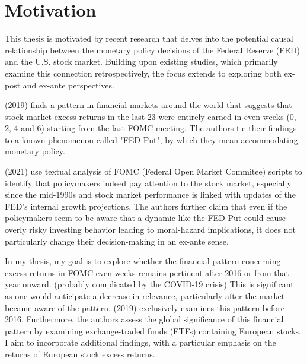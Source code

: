 
\chapter{Motivation}

This thesis is motivated by recent research that delves into the potential causal relationship between the monetary policy decisions of the Federal Reserve (FED) and the U.S. stock market.  Building upon existing studies, which primarily examine this connection retrospectively,  the focus extends to exploring both ex-post and ex-ante perspectives.

\cite{cieslak_stock_2019} (2019) finds a pattern in financial markets around the world that suggests that stock market excess returns in the last 23 were entirely earned in even weeks (0, 2, 4 and 6) starting from the last FOMC meeting. The authors tie their findings to a known phenomenon called "FED Put", by which they mean accommodating monetary policy.

\cite{cieslak_economics_2021} (2021) use textual analysis of FOMC (Federal Open Market Commitee) scripts to identify that policymakers indeed pay attention to the stock market, especially since the mid-1990s and stock market performance is linked with updates of the FED’s internal growth projections.  The authors further claim that even if the policymakers seem to be aware that a dynamic like the FED Put could cause overly risky investing behavior leading to moral-hazard implications,  it does not particularly change their decision-making in an ex-ante sense.

In my thesis, my goal is to explore whether the financial pattern concerning excess returns in FOMC even weeks remains pertinent after 2016 or from that year onward.  (probably complicated by the COVID-19 crisis) This is significant as one would anticipate a decrease in relevance, particularly after the market became aware of the pattern.  \cite{cieslak_stock_2019} (2019) exclusively examines this pattern before 2016. Furthermore, the authors assess the global significance of this financial pattern by examining exchange-traded funds (ETFs) containing European stocks. I aim to incorporate additional findings, with a particular emphasis on the returns of European stock excess returns.


